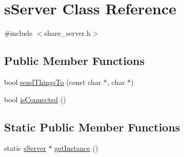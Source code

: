 \hypertarget{classs_server}{\section{s\-Server Class Reference}
\label{classs_server}
}


{\ttfamily \#include $<$share\-\_\-server.\-h$>$}

\subsection*{Public Member Functions}
\begin{DoxyCompactItemize}
\item 
bool \hyperlink{classs_server_abcd4016d1b93c045f0847a48afee0ac2}{send\-Things\-To} (const char $\ast$, char $\ast$)
\item 
bool \hyperlink{classs_server_a62561438ad0563d99bf05e84795807f9}{is\-Connected} ()
\end{DoxyCompactItemize}
\subsection*{Static Public Member Functions}
\begin{DoxyCompactItemize}
\item 
static \hyperlink{classs_server}{s\-Server} $\ast$ \hyperlink{classs_server_af98a4a292c1beaab9296a88dba9f0c13}{get\-Instance} ()
\end{DoxyCompactItemize}


